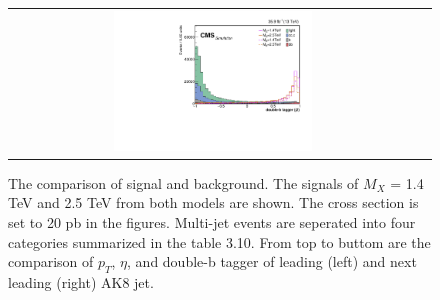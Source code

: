\begin{figure}[t]
\begin{tabular}{cc}
    \includegraphics[width=0.5\textwidth]{Figures/MC_N1/doubleSV_j1.pdf} \\
  \end{tabular}
  \caption{The comparison of signal and background. The signals of $M_{X}$ = 1.4 TeV and 2.5 TeV from both models are shown. The cross section is set to 20 pb in the figures. Multi-jet events are seperated into four categories summarized in the table 3.10. From top to buttom are the comparison of $p_{T}$, $\eta $, and double-b tagger of leading (left) and next leading (right) AK8 jet.}
  \label{fig:hvt_brs}
\end{figure}


